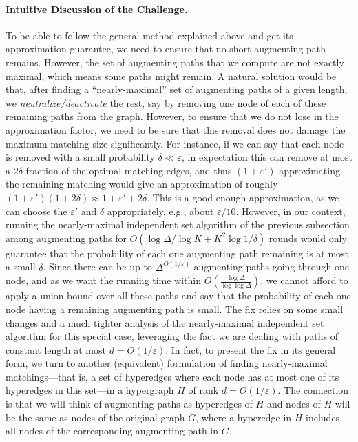 \documentclass[11pt]{article}
\newcommand{\eps}{\varepsilon}
\begin{document}
\paragraph{Intuitive Discussion of the Challenge.} To be able to follow the general method explained above and get its approximation guarantee, we need to ensure that no short augmenting path remains. However, the set of augmenting paths that we compute are not exactly maximal, which means some paths might remain. A natural solution would be that, after finding a ``nearly-maximal'' set of augmenting paths of a given length, we \emph{neutralize/deactivate} the rest, say by removing one node of each of these remaining paths from the graph. However, to ensure that we do not lose in the approximation factor, we need to be sure that this removal does not damage the maximum matching size significantly. For instance, if we can say that each node is removed with a small probability $\delta \ll \eps$, in expectation this can remove at most a $2\delta$ fraction of the optimal matching edges, and thus $(1+\eps')$-approximating the remaining matching would give an approximation of roughly $(1+\eps')(1+2\delta) \approx 1+\eps'+2\delta$. This is a good enough approximation, as we can choose the $\eps'$ and $\delta$ appropriately, e.g., about $\eps/10$. However, in our context, running the nearly-maximal independent set algorithm of the previous subsection among augmenting paths for $O(\log\Delta/\log K + K^2 \log 1/\delta)$ rounds would only guarantee that the probability of each one augmenting path remaining is at most a small $\delta$. Since there can be up to $\Delta^{O(1/\eps)}$ augmenting paths going through one node, and as we want the running time within $O(\frac{\log \Delta}{\log\log \Delta})$, we cannot afford to apply a union bound over all these paths and say that the probability of each one node having a remaining augmenting path is small. The fix relies on some small changes and a much tighter analysis of the nearly-maximal independent set algorithm for this special case, leveraging the fact we are dealing with paths of constant length at most $d= O(1/\eps)$. In fact, to present the fix in its general form, we turn to another (equivalent) formulation of finding nearly-maximal matchings---that is, a set of hyperedges where each node has at most one of its hyperedges in this set---in a hypergraph $H$ of rank $d=O(1/\eps)$. The connection is that we will think of augmenting paths as hyperedges of $H$ and nodes of $H$ will be the same as nodes of the original graph $G$, where a hyperedge in $H$ includes all nodes of the corresponding augmenting path in $G$.
\end{document}
